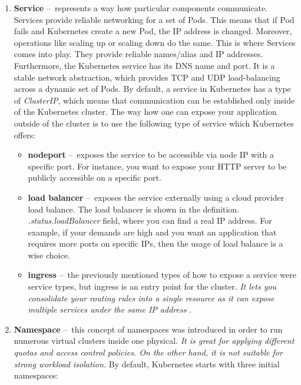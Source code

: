 \begin{enumerate}[itemsep=1mm, parsep=0pt]
    \item \textbf{Service} \---\ represents a way how particular components communicate. Services provide reliable networking for a set of Pods. This means that if Pod fails and Kubernetes create a new Pod, the IP address is changed. Moreover, operations like scaling up or scaling down do the same. This is where Services comes into play. They provide reliable names/alias and IP addresses. Furthermore, the Kubernetes service has its DNS name and port. It is a stable network abstraction, which provides TCP and UDP load-balancing across a dynamic set of Pods. By default, a service in Kubernetes has a type of \emph{ClusterIP}, which means that communication can be established only inside of the Kubernetes cluster. The way how one can expose your application outside of the cluster is to use the following type of service which Kubernetes offers:
         \begin{itemize}[itemsep=1mm, parsep=0pt]
            \item \textbf{nodeport} \---\ exposes the service to be accessible via node IP with a specific port. For instance, you want to expose your HTTP server to be publicly accessible on a specific port.
            \item \textbf{load balancer} \---\  exposes the service externally using a cloud provider load balance. The load balancer is shown in the definition. \emph{.status.loadBalancer} field, where you can find a real IP address. For example, if your demands are high and you want an application that requires more ports on specific IPs, then the usage of load balance is a wise choice.
            \item \textbf{ingress} \---\  the previously mentioned types of how to expose a service were service types, but ingress is an entry point for the cluster. \textit{It lets you consolidate your routing rules into a single resource as it can expose multiple services under the same IP address} \cite{ingress}.
        \end{itemize}
        
    \item \textbf{Namespace} \---\ this concept of namespaces was introduced in order to run numerous virtual clusters inside one physical. \emph{It is great for applying different quotas and access control policies. On the other hand, it is not suitable for strong workload isolation.} By default, Kubernetes starts with three initial namespaces:


\end{enumerate}
